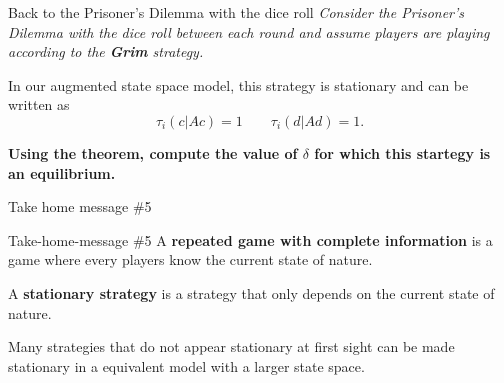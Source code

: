 \begin{frame}{Back to the Prisoner's Dilemma with the dice roll}
    \textit{Consider the Prisoner's Dilemma with the dice roll between each round
    and assume players are playing according to the \textbf{Grim} strategy.}
   
    \vspace{0.5cm}
    In our augmented state space model, this strategy is stationary and can be written as
    $$\tau_i(c|Ac) = 1 \qquad \tau_i(d|Ad) = 1.$$
    
    \vspace{1cm}
    \textbf{\color{green}Using the theorem, compute the value of $\delta$ for which this startegy
    is an equilibrium.}
\end{frame}


\begin{frame}{Take home message \#5}
    \begin{block}{Take-home-message \#5}
        A \textbf{repeated game with complete information} is a game where {\color{green}
        every players know the current state of nature}.
        
        A \textbf{stationary strategy} is a strategy that {\color{green}only depends on the current
        state of nature}.
        
        Many strategies that do not appear stationary at first sight can be made stationary in a equivalent
        model with a larger state space.
    \end{block}
\end{frame}
